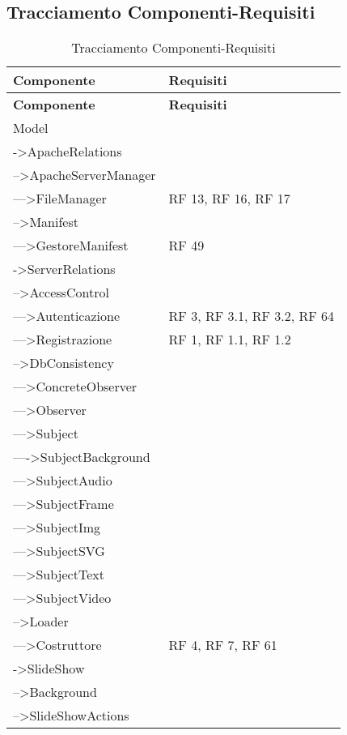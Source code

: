 \subsection{Tracciamento Componenti-Requisiti}{ 
\renewcommand*{\arraystretch}{1.4} 
\begin{longtable} [c]{| p{8cm} | p{6cm} |} 
\caption{Tracciamento Componenti-Requisiti \label{tab:traccCompReq}}\\ \hline\textbf{Componente} & \textbf{Requisiti} \\ 
\hline \endfirsthead \hline 
\textbf{Componente} & \textbf{Requisiti} \\ 
\hline \endhead \hline \endfoot \hline \endlastfoot 
Model & \\ 
 \hline 
->ApacheRelations & \\ 
 \hline 
-->ApacheServerManager & \\ 
 \hline 
--->FileManager & RF 13, RF 16, RF 17\\ 
 \hline 
-->Manifest & \\ 
 \hline 
--->GestoreManifest & RF 49\\ 
 \hline 
->ServerRelations & \\ 
 \hline 
-->AccessControl & \\ 
 \hline 
--->Autenticazione & RF 3, RF 3.1, RF 3.2, RF 64\\ 
 \hline 
--->Registrazione & RF 1, RF 1.1, RF 1.2\\ 
 \hline 
-->DbConsistency & \\ 
 \hline 
--->ConcreteObserver & \\ 
 \hline 
--->Observer & \\ 
 \hline 
--->Subject & \\ 
 \hline 
---->SubjectBackground & \\ 
 \hline 
--->SubjectAudio & \\ 
 \hline 
--->SubjectFrame & \\ 
 \hline 
--->SubjectImg & \\ 
 \hline 
--->SubjectSVG & \\ 
 \hline 
--->SubjectText & \\ 
 \hline 
--->SubjectVideo & \\ 
 \hline 
-->Loader & \\ 
 \hline 
--->Costruttore & RF 4, RF 7, RF 61\\ 
 \hline 
->SlideShow & \\ 
 \hline 
-->Background & \\ 
 \hline 
-->SlideShowActions & \\ 

\end{longtable}}
